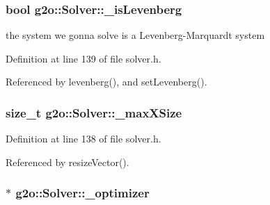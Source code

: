 \subsubsection[{\texorpdfstring{\+\_\+is\+Levenberg}{_isLevenberg}}]{\setlength{\rightskip}{0pt plus 5cm}bool g2o\+::\+Solver\+::\+\_\+is\+Levenberg\hspace{0.3cm}{\ttfamily [protected]}}\hypertarget{classg2o_1_1Solver_a8b7f6d4e00e3734f5ed9bd3dfac201a6}{}\label{classg2o_1_1Solver_a8b7f6d4e00e3734f5ed9bd3dfac201a6}


the system we gonna solve is a Levenberg-\/\+Marquardt system 



Definition at line 139 of file solver.\+h.



Referenced by levenberg(), and set\+Levenberg().

\subsubsection[{\texorpdfstring{\+\_\+max\+X\+Size}{_maxXSize}}]{\setlength{\rightskip}{0pt plus 5cm}size\+\_\+t g2o\+::\+Solver\+::\+\_\+max\+X\+Size\hspace{0.3cm}{\ttfamily [protected]}}\hypertarget{classg2o_1_1Solver_a263003f9053537f92d5d019ce5c53771}{}\label{classg2o_1_1Solver_a263003f9053537f92d5d019ce5c53771}


Definition at line 138 of file solver.\+h.



Referenced by resize\+Vector().

\subsubsection[{\texorpdfstring{\+\_\+optimizer}{_optimizer}}]{$\ast$ g2o\+::\+Solver\+::\+\_\+optimizer\hspace{0.3cm}{\ttfamily [protected]}}\hypertarget{classg2o_1_1Solver_aff3275985d996329df15070348c21292}{}\label{classg2o_1_1Solver_aff3275985d996329df15070348c21292}


